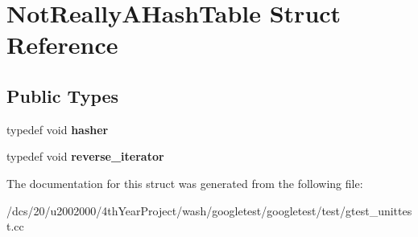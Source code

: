 \hypertarget{structNotReallyAHashTable}{}\section{Not\+Really\+A\+Hash\+Table Struct Reference}
\label{structNotReallyAHashTable}
\subsection*{Public Types}
\begin{DoxyCompactItemize}
\item 
\mbox{\label{structNotReallyAHashTable_a0206bef6150919c8ba5d539d5bf555f7}} 
typedef void {\bfseries hasher}
\item 
\mbox{\label{structNotReallyAHashTable_a8dbee2a2a80768191c736fb57367cfe7}} 
typedef void {\bfseries reverse\+\_\+iterator}
\end{DoxyCompactItemize}


The documentation for this struct was generated from the following file\+:\begin{DoxyCompactItemize}
\item 
/dcs/20/u2002000/4th\+Year\+Project/wash/googletest/googletest/test/gtest\+\_\+unittest.\+cc\end{DoxyCompactItemize}
